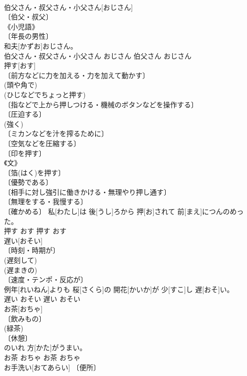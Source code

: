 \documentclass[8pt]{extreport}
\begin{document}
\begin{CJK}{UTF8}{min}
\\	伯父さん・叔父さん・小父さん[おじさん]	
\\	〔伯父・叔父〕 
\\	《小児語》 
\\	〔年長の男性〕 
\\	和夫[かずお]おじさん。	
\\	伯父さん・叔父さん・小父さん	おじさん	伯父さん	おじさん	
\\	押す[おす]	
\\	〔前方などに力を加える・力を加えて動かす〕 
\\	(頭や角で) 
\\	(ひじなどでちょっと押す) 
\\	〔指などで上から押しつける・機械のボタンなどを操作する〕 
\\	〔圧迫する〕 
\\	(強く) 
\\	〔ミカンなどを汁を搾るために〕 
\\	〔空気などを圧縮する〕 
\\	〔印を押す〕 
\\	《文》 
\\	〔箔(はく)を押す〕 
\\	〔優勢である〕 
\\	〔相手に対し強引に働きかける・無理やり押し通す〕 
\\	〔無理をする・我慢する〕 
\\	〔確かめる〕	私[わたし]は 後[うし]ろから 押[お]されて 前[まえ]につんのめった。	
\\	押す	おす	押す	おす	
\\	遅い[おそい]	
\\	〔時刻・時期が〕 
\\	(遅刻して) 
\\	(遅まきの) 
\\	〔速度・テンポ・反応が〕 
\\	例年[れいねん]よりも 桜[さくら]の 開花[かいか]が 少[すこ]し 遅[おそ]い。	
\\	遅い	おそい	遅い	おそい	
\\	お茶[おちゃ]	
\\	〔飲みもの〕 
\\	(緑茶) 
\\	〔休憩〕 
\\	[⇒ちゃ 
\\	〔茶の湯〕 
\\	お茶[おちゃ]のいれ 方[かた]がうまい。	
\\	お茶	おちゃ	お茶	おちゃ	
\\	お手洗い[おてあらい]	〔便所〕 

\end{CJK}
\end{document}
